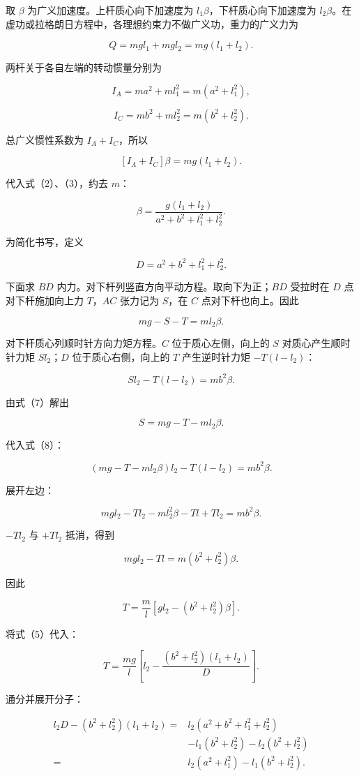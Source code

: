 \documentclass[12pt,a4paper,UTF8]{ctexart}
\begin{document}
取 \(\beta\) 为广义加速度。上杆质心向下加速度为
\(l_1\beta\)，下杆质心向下加速度为
\(l_2\beta\)。在虚功或拉格朗日方程中，各理想约束力不做广义功，重力的广义力为

\[
Q=mg l_1+mg l_2=mg(l_1+l_2). \tag{1}
\]

两杆关于各自左端的转动惯量分别为

\[
I_A=ma^2+ml_1^2=m(a^2+l_1^2), \tag{2}
\]

\[
I_C=mb^2+ml_2^2=m(b^2+l_2^2). \tag{3}
\]

总广义惯性系数为 \(I_A+I_C\)，所以

\[
[I_A+I_C]\beta=mg(l_1+l_2). \tag{4}
\]

代入式（2）、（3），约去 \(m\)：

\[
\boxed{\beta=
\frac{g(l_1+l_2)}{a^2+b^2+l_1^2+l_2^2}}. \tag{5}
\]

为简化书写，定义

\[
D=a^2+b^2+l_1^2+l_2^2. \tag{6}
\]

下面求 \(BD\) 内力。对下杆列竖直方向平动方程。取向下为正；\(BD\)
受拉时在 \(D\) 点对下杆施加向上力 \(T\)，\(AC\) 张力记为 \(S\)，在 \(C\)
点对下杆也向上。因此

\[
mg-S-T=m l_2\beta. \tag{7}
\]

对下杆质心列顺时针方向力矩方程。\(C\) 位于质心左侧，向上的 \(S\)
对质心产生顺时针力矩 \(Sl_2\)；\(D\) 位于质心右侧，向上的 \(T\)
产生逆时针力矩 \(-T(l-l_2)\)：

\[
S l_2-T(l-l_2)=mb^2\beta. \tag{8}
\]

由式（7）解出

\[
S=mg-T-ml_2\beta. \tag{9}
\]

代入式（8）：

\[
(mg-T-ml_2\beta)l_2-T(l-l_2)=mb^2\beta. \tag{10}
\]

展开左边：

\[
mgl_2-Tl_2-ml_2^2\beta-Tl+Tl_2=mb^2\beta. \tag{11}
\]

\(-Tl_2\) 与 \(+Tl_2\) 抵消，得到

\[
mgl_2-Tl=m(b^2+l_2^2)\beta. \tag{12}
\]

因此

\[
T=\frac m l\left[gl_2-(b^2+l_2^2)\beta\right]. \tag{13}
\]

将式（5）代入：

\[
T=\frac{mg}{l}
\left[l_2-\frac{(b^2+l_2^2)(l_1+l_2)}D\right]. \tag{14}
\]

通分并展开分子：

\[
\begin{aligned}
l_2D-(b^2+l_2^2)(l_1+l_2)
={}&l_2(a^2+b^2+l_1^2+l_2^2)\\
&-l_1(b^2+l_2^2)-l_2(b^2+l_2^2)\\
={}&l_2(a^2+l_1^2)-l_1(b^2+l_2^2).
\end{aligned} \tag{15}
\]
\end{document}
